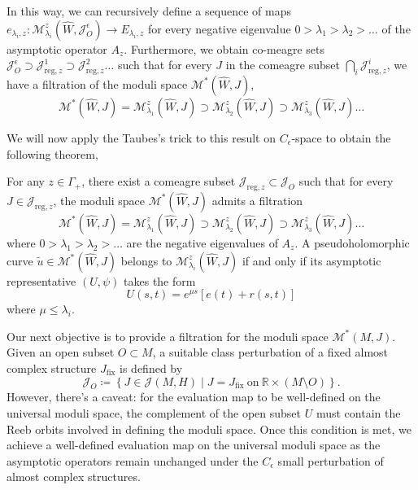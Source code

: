 \documentclass[11pt, a4paper]{amsart}
\newcommand{\R}{\mathbb{R}}
\newcommand{\cJ}{\mathcal{J}}
\newcommand{\cM}{\mathcal{M}}
\begin{document}
In this way, we can recursively define a sequence of maps $e_{\lambda_i,z}:\cM^z_{\lambda_{i}}(\widehat{W},\cJ^{\epsilon}_O) \rightarrow E_{\lambda_{i},z}$ for every negative eigenvalue $0>\lambda_1>\lambda_2 > \dots$ of the asymptotic operator $A_z$. Furthermore, we obtain co-meagre sets $\cJ^{\epsilon}_{O} \supset \cJ^1_{\mathrm{reg},z} \supset \cJ^2_{\mathrm{reg},z} \dots$ such that for every $ J$ in the comeagre subset $\bigcap\limits_i \cJ^i_{\mathrm{reg},z}$, we have a filtration of the moduli space $\cM^*(\widehat{W},J)$,
$$\cM^*(\widehat{W},J) = \cM^z_{\lambda_1}(\widehat{W},J) \supset \cM^z_{\lambda_2}(\widehat{W},J) \supset \cM^z_{\lambda_3}(\widehat{W},J) \dots $$

We will now apply the Taubes's trick\cite[Section~7.7]{SFTwendl} to this result on $C_{\epsilon}$-space to obtain the following theorem,

\begin{theorem} \label{stratification_symplectization}
For any $z\in \Gamma_+$, there exist a comeagre subset $\cJ_{\mathrm{reg},z} \subset \cJ_O$ such that for every $J \in \cJ_{\mathrm{reg},z}$, the moduli space $\cM^*(\widehat{W},J)$ admits a filtration 
$$\cM^*(\widehat{W},J) = \cM^z_{\lambda_1}(\widehat{W},J) \supset \cM^z_{\lambda_2}(\widehat{W},J) \supset \cM^z_{\lambda_3}(\widehat{W},J) \dots $$
where $0>\lambda_1> \lambda_2> \dots $ are the negative eigenvalues of $A_z$. A pseudoholomorphic curve $\tilde{u}\in \cM^*(\widehat{W},J)$ belongs to $\cM^z_{\lambda_i}(\widehat{W},J)$ if and only if its asymptotic representative $(U, \psi)$ takes the form
$$U(s, t) = e^{\mu s} [e(t) + r (s, t)]$$
where $\mu \leq \lambda_i$.
\end{theorem}

Our next objective is to provide a filtration for the moduli space \(\mathcal{M}^*(M,J)\). Given an open subset $O\subset M$, a suitable class perturbation of a fixed almost complex structure $J_{\mathrm{fix}}$ is defined by
$$\cJ_O\coloneqq \left\{ J \in \cJ(M,H) \mid J=J_{\mathrm{fix}} \mathrm{\ on \ } \R \times (M\setminus O)\right\}.$$ 
However, there's a caveat: for the evaluation map to be well-defined on the universal moduli space, the complement of the open subset $U$ must contain the Reeb orbits involved in defining the moduli space. Once this condition is met, we achieve a well-defined evaluation map on the universal moduli space as the asymptotic operators remain unchanged under the $C_{\epsilon}$ small perturbation of almost complex structures.\\
\end{document}
